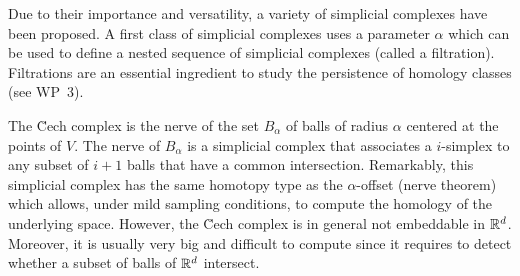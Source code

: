 


Due to their importance and versatility, a variety of simplicial complexes have been proposed. A first class of simplicial complexes uses a parameter $\alpha$ which can be used to define a nested sequence of simplicial complexes (called a filtration). Filtrations are an essential ingredient to study the persistence of homology classes (see WP~3).

The \u{C}ech complex is the nerve of the set $B_{\alpha}$ of balls of
radius $\alpha$ centered at the points of $V$. The nerve of
$B_{\alpha}$  is a simplicial complex that associates a
$i$-simplex to any subset of $i+1$ balls that have a common
intersection. Remarkably, this simplicial
complex  has the same homotopy type as the $\alpha$-offset (nerve theorem) which allows,  under mild sampling conditions, to compute the homology of the underlying space. However,
the \u{C}ech complex is in general not embeddable in $\mathbb R ^d$. Moreover, it is usually very big and
difficult to compute since it requires to detect whether a subset of
balls of  $\mathbb R ^d$ intersect. 

